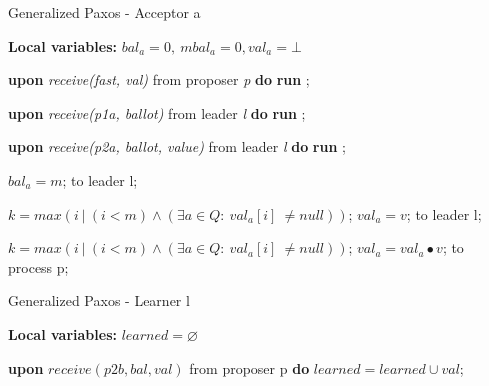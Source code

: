 \documentclass[10pt,pdftex,a4paper]{article}%
\def\val{\textit{val}}
\begin{document}
\begin{algorithm}
\caption{Generalized Paxos - Acceptor a}
\textbf{Local variables: } $bal_a = 0,\ mbal_a = 0, \val_a = \bot$ 
\begin{algorithmic}[1]
  
  \State \textbf{upon} \textit{receive(fast, val)} from proposer \textit{p} \textbf{do}
    \State \hspace{\algorithmicindent} \textbf{run} ;
    
    \State
    \State \textbf{upon} \textit{receive(p1a, ballot)} from leader \textit{l} \textbf{do}
    \State \hspace{\algorithmicindent} \textbf{run} ;
    
    \State
    \State \textbf{upon} \textit{receive(p2a, ballot, value)} from leader \textit{l} \textbf{do}
    \State \hspace{\algorithmicindent} \textbf{run} ;
    
    \State
            \State $bal_a = m$;
            \State {} to leader l;
        \EndIf
    \EndFunction
    
    \State
        \State $k = max(i\ |\ (i < m) \wedge (\exists a \in Q :\ val_a[i]\ \neq null))$;
            \State $val_a = v$;
            \State {} to leader l;
        \EndIf
    \EndFunction
    
    \State
        \State $k = max(i\ |\ (i < m) \wedge (\exists a \in Q :\ val_a[i]\ \neq null))$;
            \State $val_a = val_a \bullet v$;
            \State {} to process p;
        \EndIf
    \EndFunction
    
\end{algorithmic}
\end{algorithm}

\begin{algorithm}
\caption{Generalized Paxos - Learner l}
\textbf{Local variables: } $learned = \varnothing$ 
\begin{algorithmic}[1]
  
    \State \textbf{upon} $receive (p2b, bal, val)$ from proposer p \textbf{do}
        \State \hspace{\algorithmicindent} $learned = learned \cup val$;
\end{algorithmic}
\end{algorithm}

\setcounter{page}{1}


\end{document}

